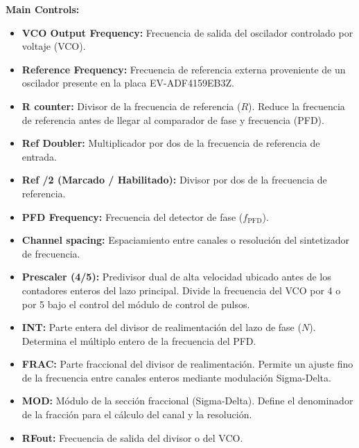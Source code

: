 \textbf{Main Controls:}
\begin{itemize}
    \item \textbf{VCO Output Frequency:} Frecuencia de salida del oscilador controlado por voltaje (VCO).
    
    \item \textbf{Reference Frequency:} Frecuencia de referencia externa proveniente de un oscilador presente en la placa EV-ADF4159EB3Z.
    
    \item \textbf{R counter:} Divisor de la frecuencia de referencia ($R$). Reduce la frecuencia de referencia antes de llegar al comparador de fase y frecuencia (PFD).
    
    \item \textbf{Ref Doubler:} Multiplicador por dos de la frecuencia de referencia de entrada.
    
    \item \textbf{Ref /2 (Marcado / Habilitado):} Divisor por dos de la frecuencia de referencia.
    
    \item \textbf{PFD Frequency:} Frecuencia del detector de fase ($f_{\mathrm{PFD}}$).
    
    \item \textbf{Channel spacing:} Espaciamiento entre canales o resolución del sintetizador de frecuencia.
    
    \item \textbf{Prescaler (4/5):} Predivisor dual de alta velocidad ubicado antes de los contadores enteros del lazo principal. Divide la frecuencia del VCO por 4 o por 5 bajo el control del módulo de control de pulsos.
    
    \item \textbf{INT:} Parte entera del divisor de realimentación del lazo de fase ($N$). Determina el múltiplo entero de la frecuencia del PFD.
    
    \item \textbf{FRAC:} Parte fraccional del divisor de realimentación. Permite un ajuste fino de la frecuencia entre canales enteros mediante modulación Sigma-Delta.
    
    \item \textbf{MOD:} Módulo de la sección fraccional (Sigma-Delta). Define el denominador de la fracción para el cálculo del canal y la resolución.
    
    \item \textbf{RFout:} Frecuencia de salida del divisor o del VCO.
    

\end{itemize}
